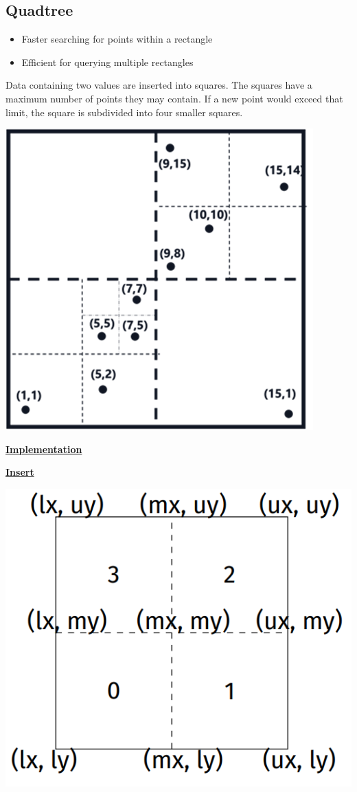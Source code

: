 \subsection{Quadtree}
    \begin{itemize}
        \item Faster searching for points within a rectangle
        \item Efficient for querying multiple rectangles
    \end{itemize}
    Data containing two values are inserted into squares. The squares have a maximum number of points they may contain. If a new point would exceed that limit, the square is subdivided into four smaller squares.\\
    {\centering \includegraphics[width = 0.5\linewidth]{src/5_data_structure/images/quadtree.png} \par}

    {\centering\underline{\textbf{Implementation}}\par}
        

    {\centering\underline{\textbf{Insert}}\par}
        {\centering \includegraphics[width = 0.6\linewidth]{src/5_data_structure/images/quad_divide.png} \par}
        
    
